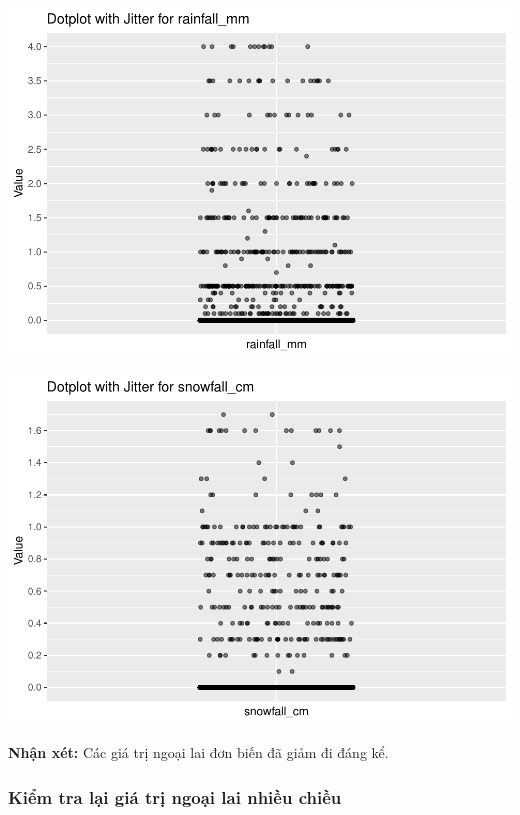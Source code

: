 \documentclass[
  11pt,
  letterpaper,
]{article}
\begin{document}
\begin{center}\includegraphics[width=1.2\linewidth,]{Final_Project_files/figure-latex/unnamed-chunk-13-8} \end{center}

\begin{center}\includegraphics[width=1.2\linewidth,]{Final_Project_files/figure-latex/unnamed-chunk-13-9} \end{center}

\textbf{Nhận xét:} Các giá trị ngoại lai đơn biến đã giảm đi đáng kể.

\subsubsection{Kiểm tra lại giá trị ngoại lai nhiều chiều}
\end{document}
